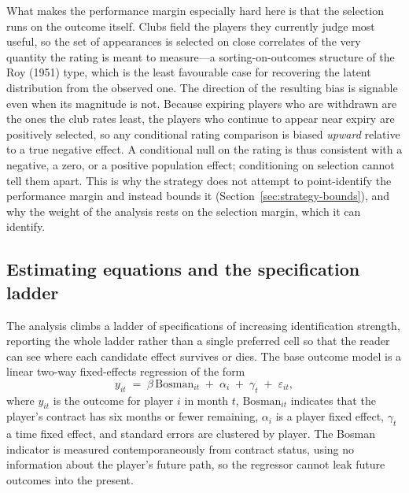 What makes the performance margin especially hard here is that the selection runs
on the outcome itself. Clubs field the players they currently judge most useful, so
the set of appearances is selected on close correlates of the very quantity the
rating is meant to measure---a sorting-on-outcomes structure of the Roy (1951)
type, which is the least favourable case for recovering the latent distribution
from the observed one. The direction of the resulting bias is signable even when
its magnitude is not. Because expiring players who are withdrawn are the ones the
club rates least, the players who continue to appear near expiry are positively
selected, so any conditional rating comparison is biased \emph{upward} relative to
a true negative effect. A conditional null on the rating is thus consistent with a
negative, a zero, or a positive population effect; conditioning on selection cannot
tell them apart. This is why the strategy does not attempt to point-identify the
performance margin and instead bounds it (Section~\ref{sec:strategy-bounds}), and
why the weight of the analysis rests on the selection margin, which it can identify.

\subsection{Estimating equations and the specification ladder}
\label{sec:strategy-ladder}

The analysis climbs a ladder of specifications of increasing identification
strength, reporting the whole ladder rather than a single preferred cell so that
the reader can see where each candidate effect survives or dies. The base outcome
model is a linear two-way fixed-effects regression of the form
\[
  y_{it} \;=\; \beta\,\mathrm{Bosman}_{it} \;+\; \alpha_i \;+\; \gamma_t \;+\; \varepsilon_{it},
\]
where $y_{it}$ is the outcome for player $i$ in month $t$, $\mathrm{Bosman}_{it}$
indicates that the player's contract has six months or fewer remaining, $\alpha_i$
is a player fixed effect, $\gamma_t$ a time fixed effect, and standard errors are
clustered by player. The Bosman indicator is measured contemporaneously from
contract status, using no information about the player's future path, so the
regressor cannot leak future outcomes into the present.

